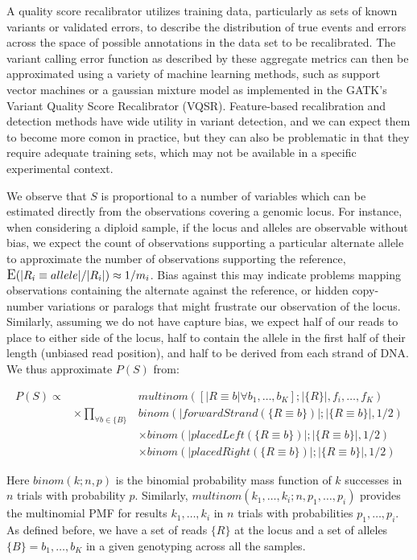 \documentclass{article}
\DeclareMathOperator*{\E}{\mbox{\large E}}
\begin{document}
A quality score recalibrator utilizes training data, particularly as sets of known variants or validated errors, to describe the distribution of true events and errors across the space of possible annotations in the data set to be recalibrated.  The variant calling error function as described by these aggregate metrics can then be approximated using a variety of machine learning methods, such as support vector machines \citep{snpsvm} or a gaussian mixture model as implemented in the GATK's Variant Quality Score Recalibrator (VQSR).  Feature-based recalibration and detection methods have wide utility in variant detection, and we can expect them to become more comon in practice, but they can also be problematic in that they require adequate training sets, which may not be available in a specific experimental context.

We observe that $S$ is proportional to a number of variables which can be estimated directly from the observations covering a genomic locus.  For instance, when considering a diploid sample, if the locus and alleles are observable without bias, we expect the count of observations supporting a particular alternate allele to approximate the number of observations supporting the reference, $\E(|R_i \equiv allele|/|R_i|) \approx 1/m_i$.  Bias against this may indicate problems mapping observations containing the alternate against the reference, or hidden copy-number variations or paralogs that might frustrate our observation of the locus.  Similarly, assuming we do not have capture bias, we expect half of our reads to place to either side of the locus, half to contain the allele in the first half of their length (unbiased read position), and half to be derived from each strand of DNA.  We thus approximate $P(S)$ from:

\begin{eqnarray}
P(S) \propto & & multinom([|R \equiv b| \forall b_1,\ldots,b_K] ; |\{R\}|, f_i,\ldots,f_K)  \\
& \times \prod_{\forall b \in \{B\}} & binom(|forwardStrand(\{R \equiv b\})|; |\{R \equiv b\}|, 1/2) \\
&  & \times binom(|placedLeft(\{R \equiv b\})|; |\{R \equiv b\}|, 1/2) \\
&  & \times binom(|placedRight(\{R \equiv b\})|; |\{R \equiv b\}|, 1/2)
\end{eqnarray}

Here $binom(k; n, p)$ is the binomial probability mass function of $k$ successes in $n$ trials with probability $p$.  Similarly, $multinom(k_1,\ldots,k_i; n, p_1,\ldots,p_i)$ provides the multinomial PMF for results $k_1,\ldots,k_i$ in $n$ trials with probabilities $p_1,\ldots,p_i$.  As defined before, we have a set of reads $\{R\}$ at the locus and a set of alleles $\{B\} = b_1,\ldots,b_K$ in a given genotyping across all the samples.
\end{document}
